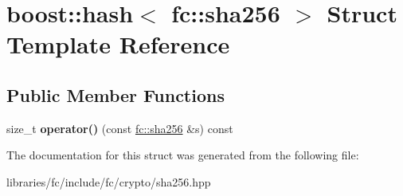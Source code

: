 \hypertarget{structboost_1_1hash_3_01fc_1_1sha256_01_4}{}\section{boost\+:\+:hash$<$ fc\+:\+:sha256 $>$ Struct Template Reference}
\label{structboost_1_1hash_3_01fc_1_1sha256_01_4}
\subsection*{Public Member Functions}
\begin{DoxyCompactItemize}
\item 
\mbox{\label{structboost_1_1hash_3_01fc_1_1sha256_01_4_ad9998dab7ec57359493783a742685bc8}} 
size\+\_\+t {\bfseries operator()} (const \mbox{\hyperlink{classfc_1_1sha256}{fc\+::sha256}} \&s) const
\end{DoxyCompactItemize}


The documentation for this struct was generated from the following file\+:\begin{DoxyCompactItemize}
\item 
libraries/fc/include/fc/crypto/sha256.\+hpp\end{DoxyCompactItemize}
